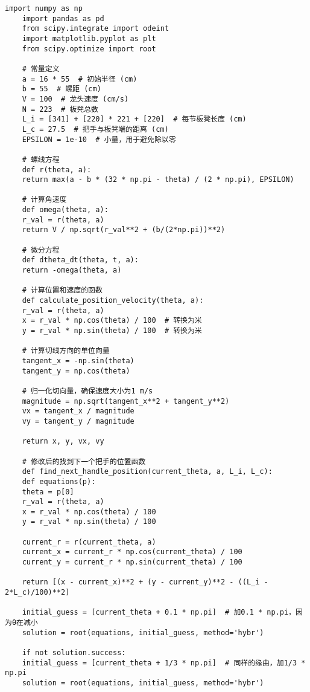 
\begin{lstlisting}[caption={问题一处理代码1}]
	import numpy as np
	import pandas as pd
	from scipy.integrate import odeint
	import matplotlib.pyplot as plt
	from scipy.optimize import root
	
	# 常量定义
	a = 16 * 55  # 初始半径 (cm)
	b = 55  # 螺距 (cm)
	V = 100  # 龙头速度 (cm/s)
	N = 223  # 板凳总数
	L_i = [341] + [220] * 221 + [220]  # 每节板凳长度 (cm)
	L_c = 27.5  # 把手与板凳端的距离 (cm)
	EPSILON = 1e-10  # 小量，用于避免除以零
	
	# 螺线方程
	def r(theta, a):
	return max(a - b * (32 * np.pi - theta) / (2 * np.pi), EPSILON)
	
	# 计算角速度
	def omega(theta, a):
	r_val = r(theta, a)
	return V / np.sqrt(r_val**2 + (b/(2*np.pi))**2)
	
	# 微分方程
	def dtheta_dt(theta, t, a):
	return -omega(theta, a)
	
	# 计算位置和速度的函数
	def calculate_position_velocity(theta, a):
	r_val = r(theta, a)
	x = r_val * np.cos(theta) / 100  # 转换为米
	y = r_val * np.sin(theta) / 100  # 转换为米
	
	# 计算切线方向的单位向量
	tangent_x = -np.sin(theta)
	tangent_y = np.cos(theta)
	
	# 归一化切向量，确保速度大小为1 m/s
	magnitude = np.sqrt(tangent_x**2 + tangent_y**2)
	vx = tangent_x / magnitude
	vy = tangent_y / magnitude
	
	return x, y, vx, vy
	
	# 修改后的找到下一个把手的位置函数
	def find_next_handle_position(current_theta, a, L_i, L_c):
	def equations(p):
	theta = p[0]
	r_val = r(theta, a)
	x = r_val * np.cos(theta) / 100
	y = r_val * np.sin(theta) / 100
	
	current_r = r(current_theta, a)
	current_x = current_r * np.cos(current_theta) / 100
	current_y = current_r * np.sin(current_theta) / 100
	
	return [(x - current_x)**2 + (y - current_y)**2 - ((L_i - 2*L_c)/100)**2]
	
	initial_guess = [current_theta + 0.1 * np.pi]  # 加0.1 * np.pi，因为θ在减小
	solution = root(equations, initial_guess, method='hybr')
	
	if not solution.success:
	initial_guess = [current_theta + 1/3 * np.pi]  # 同样的缘由，加1/3 * np.pi
	solution = root(equations, initial_guess, method='hybr')
	

\end{lstlisting}
